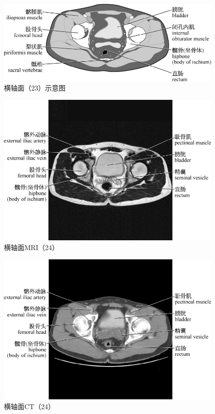 \begin{figure}[!htbp]
 \centering
 \includegraphics{./images/Image00070.jpg}
 \captionsetup{justification=centering}
 \caption{横轴面（23）示意图}
  \end{figure} 
 \FloatBarrier

\begin{figure}[!htbp]
 \centering
 \includegraphics{./images/Image00071.jpg}
 \captionsetup{justification=centering}
 \caption{横轴面MRI（24）}
  \end{figure} 
 \FloatBarrier

\begin{figure}[!htbp]
 \centering
 \includegraphics{./images/Image00072.jpg}
 \captionsetup{justification=centering}
 \caption{横轴面CT（24）}
  \end{figure} 
 \FloatBarrier

